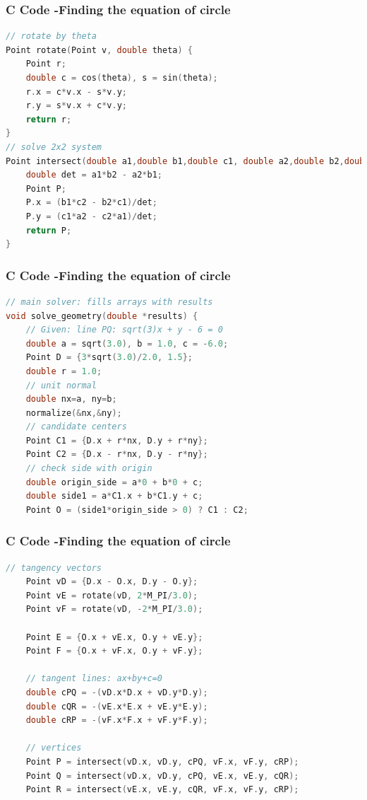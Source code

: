 \documentclass{beamer}
\begin{document}
\begin{frame}[fragile]
    \frametitle{C Code -Finding the equation of circle}

    \begin{lstlisting}[language=C]
// rotate by theta
Point rotate(Point v, double theta) {
    Point r;
    double c = cos(theta), s = sin(theta);
    r.x = c*v.x - s*v.y;
    r.y = s*v.x + c*v.y;
    return r;
}
// solve 2x2 system
Point intersect(double a1,double b1,double c1, double a2,double b2,double c2) {
    double det = a1*b2 - a2*b1;
    Point P;
    P.x = (b1*c2 - b2*c1)/det;
    P.y = (c1*a2 - c2*a1)/det;
    return P;
}
    \end{lstlisting}
\end{frame}

\begin{frame}[fragile]
    \frametitle{C Code -Finding the equation of circle}

    \begin{lstlisting}[language=C]
// main solver: fills arrays with results
void solve_geometry(double *results) {
    // Given: line PQ: sqrt(3)x + y - 6 = 0
    double a = sqrt(3.0), b = 1.0, c = -6.0;
    Point D = {3*sqrt(3.0)/2.0, 1.5};
    double r = 1.0;
    // unit normal
    double nx=a, ny=b;
    normalize(&nx,&ny);
    // candidate centers
    Point C1 = {D.x + r*nx, D.y + r*ny};
    Point C2 = {D.x - r*nx, D.y - r*ny};
    // check side with origin
    double origin_side = a*0 + b*0 + c;
    double side1 = a*C1.x + b*C1.y + c;
    Point O = (side1*origin_side > 0) ? C1 : C2;

    \end{lstlisting}
\end{frame}

\begin{frame}[fragile]
    \frametitle{C Code -Finding the equation of circle}

    \begin{lstlisting}[language=C]
    // tangency vectors
    Point vD = {D.x - O.x, D.y - O.y};
    Point vE = rotate(vD, 2*M_PI/3.0);
    Point vF = rotate(vD, -2*M_PI/3.0);

    Point E = {O.x + vE.x, O.y + vE.y};
    Point F = {O.x + vF.x, O.y + vF.y};

    // tangent lines: ax+by+c=0
    double cPQ = -(vD.x*D.x + vD.y*D.y);
    double cQR = -(vE.x*E.x + vE.y*E.y);
    double cRP = -(vF.x*F.x + vF.y*F.y);

    // vertices
    Point P = intersect(vD.x, vD.y, cPQ, vF.x, vF.y, cRP);
    Point Q = intersect(vD.x, vD.y, cPQ, vE.x, vE.y, cQR);
    Point R = intersect(vE.x, vE.y, cQR, vF.x, vF.y, cRP);
    \end{lstlisting}
\end{frame}
\end{document}
